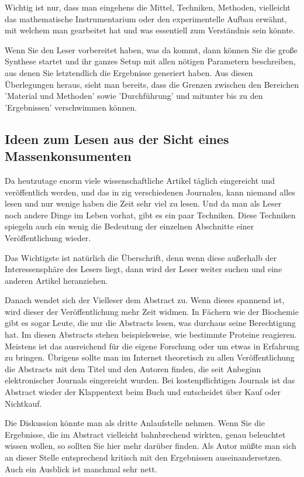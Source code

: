 \documentclass[10pt,twocolumn]{scrartcl}
\begin{document}
Wichtig ist nur, dass man eingehens die Mittel, Techniken,
Methoden, vielleicht das mathematische Instrumentarium 
oder den experimentelle Aufbau erwähnt, mit welchem man 
gearbeitet hat und was essentiell zum Verständnis sein könnte.

Wenn Sie den Leser vorbereitet haben, was da kommt, dann können
Sie die große Synthese startet und ihr ganzes Setup mit allen
nötigen Parametern beschreiben, aus denen Sie letztendlich
die Ergebnisse generiert haben. Aus diesen Überlegungen heraus, 
sieht man bereits, dass die Grenzen zwischen den Bereichen 
'Material und Methoden' sowie 'Durchführung' und mitunter 
bis zu den 'Ergebnissen' verschwimmen können.

\subsection*{Ideen zum Lesen aus der Sicht eines Massenkonsumenten}

Da heutzutage enorm viele wissenschaftliche Artikel
täglich eingereicht und veröffentlich werden, und das in zig verschiedenen
Journalen, kann niemand alles lesen und nur wenige haben die Zeit 
sehr viel zu lesen. Und da man als Leser noch andere Dinge im Leben 
vorhat, gibt es ein paar Techniken.
Diese Techniken spiegeln auch ein wenig die Bedeutung der einzelnen 
Abschnitte einer Veröffentlichung wieder.

Das Wichtigste ist natürlich die Überschrift, denn wenn diese außerhalb
der Interessensphäre des Lesers liegt, dann wird der Leser weiter suchen
und eine anderen Artikel heranziehen.

Danach wendet sich der Vielleser dem Abstract zu. Wenn dieses spannend ist,
wird dieser der Veröffentlichung mehr Zeit widmen. In Fächern wie der
Biochemie gibt es sogar Leute, die nur die Abstracts lesen, was durchaus
seine Berechtigung hat. Im diesen Abstracts stehen beispielsweise, 
wie bestimmte Proteine reagieren. Meistens ist das ausreichend für 
die eigene Forschung oder um etwas in Erfahrung zu bringen.
Übrigens sollte man im Internet theoretisch zu allen Veröffentlichung
die Abstracts mit dem Titel und den Autoren finden, die seit Anbeginn 
elektronischer Journals eingereicht wurden. Bei kostenpflichtigen 
Journals ist das Abstract wieder der Klappentext beim Buch und
entscheidet über Kauf oder Nichtkauf.

Die Diskussion könnte man als dritte Anlaufstelle nehmen. Wenn Sie 
die Ergebnisse, die im Abstract vielleicht bahnbrechend wirkten, genau 
beleuchtet wissen wollen, so sollten Sie hier mehr darüber
finden. Als Autor müßte man sich an dieser Stelle entsprechend 
kritisch mit den Ergebnissen auseinandersetzen. Auch ein Ausblick
ist manchmal sehr nett.
\end{document}
